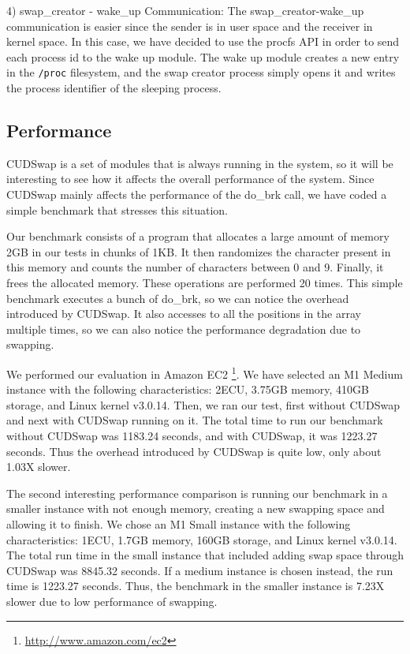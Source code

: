 4) swap\_creator - wake\_up Communication: The swap\_creator-wake\_up communication
is easier since the sender is in user space and the receiver in kernel space. In
this case, we have decided to use the procfs API in order to send each process
id to the wake up module. The wake up module creates a new entry in the \texttt{/proc}
filesystem, and the swap creator process simply opens it and writes the process
identifier of the sleeping process.

\subsection{Performance}\label{subme_perf}

CUDSwap is a set of modules that is always running in the system, so it will be
interesting to see how it affects the overall performance of the system. Since
CUDSwap mainly affects the performance of the do\_brk call, we have coded a simple
benchmark that stresses this situation.

Our benchmark consists of a program that allocates a large amount of memory 2GB in
our tests in chunks of 1KB. It then randomizes the character present in this memory
and counts the number of characters between 0 and 9. Finally, it frees the allocated
memory. These operations are performed 20 times. This simple benchmark executes a bunch
of do\_brk, so we can notice the overhead introduced by CUDSwap. It also accesses to
all the positions in the array multiple times, so we can also notice the performance
degradation due to swapping.

We performed our evaluation in Amazon EC2 \footnote{\url{ http://www.amazon.com/ec2}}. We have selected an M1 Medium instance
with the following characteristics: 2ECU, 3.75GB memory, 410GB storage, and Linux
kernel v3.0.14. Then, we ran our test, first without CUDSwap and next with CUDSwap
running on it. The total time to run our benchmark without CUDSwap was 1183.24 seconds,
and with CUDSwap, it was 1223.27 seconds. Thus the overhead introduced by CUDSwap is quite
low, only about 1.03X slower.

The second interesting performance comparison is running our benchmark in a smaller
instance with not enough memory, creating a new swapping space and allowing it to finish.
We chose an M1 Small instance with the following characteristics: 1ECU, 1.7GB memory,
160GB storage, and Linux kernel v3.0.14. The total run time in the small instance that
included adding swap space through CUDSwap was 8845.32 seconds. If a medium instance
is chosen instead, the run time is 1223.27 seconds. Thus, the benchmark in the smaller
instance is 7.23X slower due to low performance of swapping.

